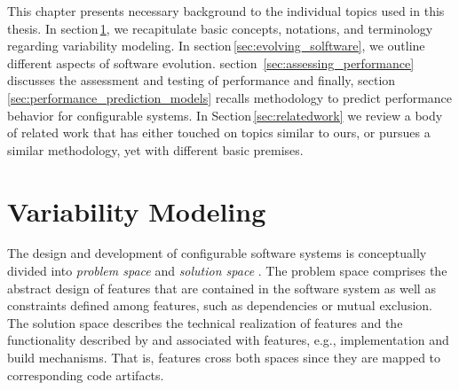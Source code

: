 This chapter presents necessary background to the individual topics used in this
thesis. In section\,\ref{sec:variability_modeling}, we recapitulate
basic concepts, notations, and terminology regarding variability modeling. In
section\,\ref{sec:evolving_solftware}, we outline different aspects of software evolution.
section~\ref{sec:assessing_performance} discusses the assessment and testing of
performance and finally, section\,\ref{sec:performance_prediction_models}
recalls methodology to predict performance behavior for configurable systems. In Section\,\ref{sec:relatedwork} we
review a body of related work that has either touched on topics similar to ours, or pursues a similar methodology, yet with different basic premises.

\section{Variability Modeling} \label{sec:variability_modeling}
The design and development of configurable software systems is conceptually
divided into \emph{problem space} and \emph{solution space} \citep{czarnecki_generative_2000}. The problem space
comprises the abstract design of features that are contained in the software
system as well as constraints defined among features, such as dependencies or mutual exclusion.
The solution space describes the technical realization of features and the
functionality described by and associated with features, e.g., implementation
and build mechanisms. That is, features cross both spaces since they are mapped
to corresponding code artifacts.

